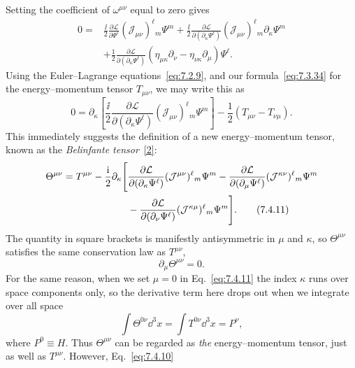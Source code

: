Setting the coefficient of $\omega^{\mu\nu}$ equal to zero gives
\begin{align*}
0={}&\frac{\ii}{2}\frac{\partial\mathcal{L}}{\partial\Psi^\ell}
(\mathcal{J}_{\mu\nu})^\ell{}_m\Psi^m
+\frac{\ii}{2}\frac{\partial\mathcal{L}}
{\partial(\partial_\kappa\Psi^\ell)}
(\mathcal{J}_{\mu\nu})^\ell{}_m\partial_\kappa\Psi^m\\
&+\frac12\frac{\partial\mathcal{L}}
{\partial(\partial_\kappa\Psi^\ell)}
(\eta_{\mu\kappa}\partial_\nu-\eta_{\nu\kappa}\partial_\mu)\Psi^\ell.
\end{align*}
Using the Euler--Lagrange equations~\eqref{eq:7.2.9}, and our formula~\eqref{eq:7.3.34} for the
energy--momentum tensor $T_{\mu\nu}$, we may write this as
\begin{equation}
0=\partial_\kappa\left[
\frac{\ii}{2}\frac{\partial\mathcal{L}}
{\partial(\partial_\kappa\Psi^\ell)}
(\mathcal{J}_{\mu\nu})^\ell{}_m\Psi^m\right]
-\frac12(T_{\mu\nu}-T_{\nu\mu}).
\tag{7.4.10}\label{eq:7.4.10}
\end{equation}
This immediately suggests the definition of a new energy--momentum tensor,
known as the \emph{Belinfante tensor}~\hyperref[ref:7.2]{[2]}:
\begin{align}
\Theta^{\mu\nu}=T^{\mu\nu}-\frac{\mathrm{i}}{2}\partial_\kappa\Bigg[&
\frac{\partial\mathcal{L}}{\partial(\partial_\kappa\Psi^\ell)}
(\mathcal{J}^{\mu\nu})^\ell{}_m\Psi^m
-\frac{\partial\mathcal{L}}{\partial(\partial_\mu\Psi^\ell)}
(\mathcal{J}^{\kappa\nu})^\ell{}_m\Psi^m\notag\\
&-\frac{\partial\mathcal{L}}{\partial(\partial_\nu\Psi^\ell)}
(\mathcal{J}^{\kappa\mu})^\ell{}_m\Psi^m\Bigg].
\tag{7.4.11}\label{eq:7.4.11}
\end{align}
The quantity in square brackets is manifestly antisymmetric in $\mu$ and
$\kappa$, so $\Theta^{\mu\nu}$ satisfies the same conservation law as
$T^{\mu\nu}$,
\begin{equation}
\partial_\mu\Theta^{\mu\nu}=0.
\tag{7.4.12}\label{eq:7.4.12}
\end{equation}
For the same reason, when we set $\mu=0$ in Eq.~\eqref{eq:7.4.11} the index $\kappa$
runs over space components only, so the derivative term here drops out when we
integrate over all space
\begin{equation}
\int\Theta^{0\nu}\dd^3x=\int T^{0\nu}\dd^3x=P^\nu,
\tag{7.4.13}\label{eq:7.4.13}
\end{equation}
where $P^0\equiv H$. Thus $\Theta^{\mu\nu}$ can be regarded as \emph{the}
energy--momentum tensor, just as well as $T^{\mu\nu}$. However, Eq.~\eqref{eq:7.4.10}
